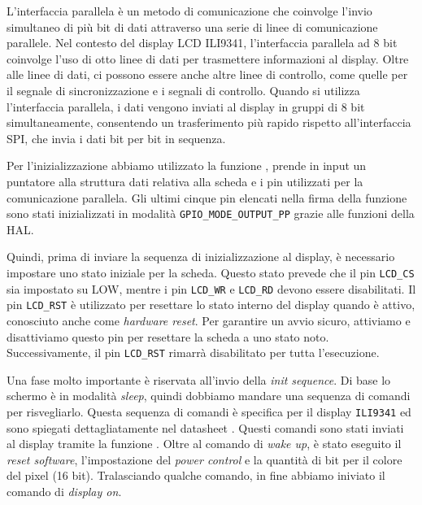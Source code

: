\documentclass[a4paper]{article}
\begin{document}
L'interfaccia parallela è un metodo di comunicazione che coinvolge l'invio simultaneo di più
bit di dati attraverso una serie di linee di comunicazione parallele. Nel contesto del display
LCD ILI9341, l'interfaccia parallela ad 8 bit coinvolge l'uso di otto linee di dati per
trasmettere informazioni al display. Oltre alle linee di dati, ci possono essere anche altre
linee di controllo, come quelle per il segnale di sincronizzazione e i segnali di controllo.
Quando si utilizza l'interfaccia parallela, i dati vengono inviati al display in gruppi di 8 bit
simultaneamente, consentendo un trasferimento più rapido rispetto all'interfaccia SPI,
che invia i dati bit per bit in sequenza.

Per l'inizializzazione abbiamo utilizzato la funzione
{},
prende in input un puntatore alla struttura dati relativa alla scheda e i pin utilizzati per la
comunicazione parallela. Gli ultimi cinque pin elencati nella firma della funzione sono stati
inizializzati in modalità \texttt{GPIO\_MODE\_OUTPUT\_PP} grazie alle funzioni della HAL.

Quindi, prima di inviare la sequenza di inizializzazione al display, è necessario impostare
uno stato iniziale per la scheda. Questo stato prevede che il pin \texttt{LCD\_CS} sia
impostato su LOW, mentre i pin \texttt{LCD\_WR} e \texttt{LCD\_RD} devono essere disabilitati.
Il pin \texttt{LCD\_RST} è utilizzato per resettare lo stato interno del display quando è attivo,
conosciuto anche come \textit{hardware reset}. Per garantire un avvio sicuro, attiviamo e
disattiviamo questo pin per resettare la scheda a uno stato noto. Successivamente,
il pin \texttt{LCD\_RST} rimarrà disabilitato per tutta l'esecuzione.

Una fase molto importante è riservata all'invio della \textit{init sequence}.
Di base lo schermo è in modalità \textit{sleep}, quindi dobbiamo mandare una sequenza di
comandi per risvegliarlo. Questa sequenza di comandi è specifica per il display \texttt{ILI9341}
ed sono spiegati dettagliatamente nel datasheet \cite{ili9341}. Questi comandi sono stati
inviati al display tramite la funzione
{}.
Oltre al comando di \textit{wake up}, è stato eseguito il \textit{reset software},
l'impostazione del \textit{power control} e la quantità di bit per il colore del pixel (16 bit).
Tralasciando qualche comando, in fine abbiamo iniviato il comando di \textit{display on}.
\end{document}
